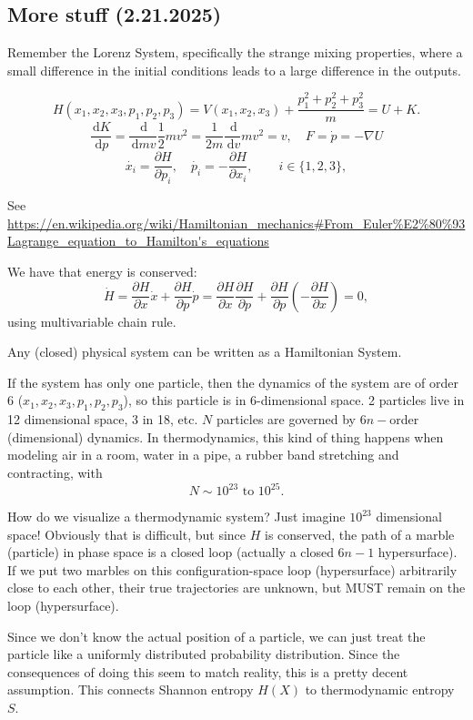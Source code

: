 \documentclass[12pt]{article}
\theoremstyle{remark}
\newcommand{\diffn}[1]{\,\mathrm{d}{#1}}
\newcommand{\fdiffn}[2]{\frac{\diffn{#1}}{\diffn{#2}}}
\begin{document}
\subsection{More stuff (2.21.2025)}
Remember the Lorenz System, specifically the strange mixing properties, where a small difference in the initial conditions leads to a large difference in the outputs. 

\[H(x_1,x_2,x_3,p_1,p_2,p_3)=V(x_1,x_2,x_3)+\frac{p_1^2+p_2^2+p_3^2}{m}=U+K.\]
\[\fdiffn{K}{p}=\fdiffn{}{mv}\frac{1}{2}mv^2=\frac{1}{2m}\fdiffn{}{v}mv^2 = v,\quad F=\dot p = -\nabla U\]
\[\dot{x_i}=\frac{\partial H}{\partial p_i},\quad\dot{p_i}=-\frac{\partial H}{\partial x_i},\qquad i\in\{1,2,3\},\]

See \url{https://en.wikipedia.org/wiki/Hamiltonian_mechanics#From_Euler%E2%80%93Lagrange_equation_to_Hamilton's_equations}

We have that energy is conserved:
\[\dot{H}=\frac{\partial H}{\partial x}\dot{x}+\frac{\partial H}{\partial p}\dot{p}=\frac{\partial H}{\partial x}\frac{\partial H}{\partial p}+\frac{\partial H}{\partial p}\left(-\frac{\partial H}{\partial x}\right)=0,\]
using multivariable chain rule.

Any (closed) physical system can be written as a Hamiltonian System.

If the system has only one particle, then the dynamics of the system are of order 6 ($x_1,x_2,x_3,p_1,p_2,p_3$), so this particle is in 6-dimensional space. 2 particles live in 12 dimensional space, 3 in 18, etc. $N$ particles are governed by $6n-$order (dimensional) dynamics. In thermodynamics, this kind of thing happens when modeling air in a room, water in a pipe, a rubber band stretching and contracting, with
\[N\sim 10^{23}\text{ to } 10^{25}.\]

How do we visualize a thermodynamic system? Just imagine $10^{23}$ dimensional space! Obviously that is difficult, but since $H$ is conserved, the path of a marble (particle) in phase space is a closed loop (actually a closed $6n-1$ hypersurface). If we put two marbles on this configuration-space loop (hypersurface) arbitrarily close to each other, their true trajectories are unknown, but MUST remain on the loop (hypersurface).

Since we don't know the actual position of a particle, we can just treat the particle like a uniformly distributed probability distribution. Since the consequences of doing this seem to match reality, this is a pretty decent assumption. This connects Shannon entropy $H(X)$ to thermodynamic entropy $S$.
\end{document}
